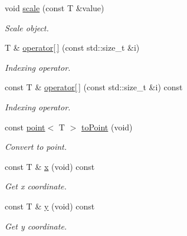 \begin{DoxyCompactItemize}
void \hyperlink{classddd_1_1vector_a958883e517d457e63d62be46580db5a0}{scale} (const T \&value)
\begin{DoxyCompactList}\small\item\em Scale object. \end{DoxyCompactList}\item 
T \& \hyperlink{classddd_1_1vector_a38e2123649fc4ebf839f22e5061b9497}{operator\mbox{[}$\,$\mbox{]}} (const std\+::size\+\_\+t \&i)
\begin{DoxyCompactList}\small\item\em Indexing operator. \end{DoxyCompactList}\item 
const T \& \hyperlink{classddd_1_1vector_a7e8d544a596450edb30914dcc21159fc}{operator\mbox{[}$\,$\mbox{]}} (const std\+::size\+\_\+t \&i) const
\begin{DoxyCompactList}\small\item\em Indexing operator. \end{DoxyCompactList}\item 
\mbox{\label{classddd_1_1vector_a03b2e6b791ba94309e97dd9f5b37cb3f}} 
const \hyperlink{classddd_1_1point}{point}$<$ T $>$ \hyperlink{classddd_1_1vector_a03b2e6b791ba94309e97dd9f5b37cb3f}{to\+Point} (void)
\begin{DoxyCompactList}\small\item\em Convert to point. \end{DoxyCompactList}\item 
\mbox{\label{classddd_1_1vector_a1108468dc6ce04acf1d74949177c97b3}} 
const T \& \hyperlink{classddd_1_1vector_a1108468dc6ce04acf1d74949177c97b3}{x} (void) const
\begin{DoxyCompactList}\small\item\em Get x coordinate. \end{DoxyCompactList}\item 
\mbox{\label{classddd_1_1vector_a678928885fa7bcdb22f25eff71f74cdd}} 
const T \& \hyperlink{classddd_1_1vector_a678928885fa7bcdb22f25eff71f74cdd}{y} (void) const
\begin{DoxyCompactList}\small\item\em Get y coordinate. \end{DoxyCompactList}\item 
\mbox{\label{classddd_1_1vector_a6f9a297e7ba387597ca0515421012166}} 

\end{DoxyCompactItemize}
